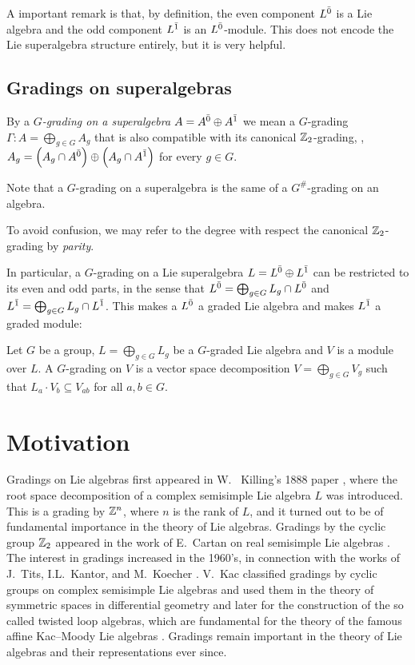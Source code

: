 A important remark is that, by definition, the even component $L^{\bar0}$ is a Lie algebra and the odd component $L^{\bar1}$ is an $L^{\bar0}$-module. This does not encode the Lie superalgebra structure entirely, but it is very helpful.

\subsection{Gradings on superalgebras}

By a \emph{$G$-grading on a superalgebra $A = A^{\bar0}\oplus A^{\bar1}$} we mean a $G$-grading $\Gamma : A= \bigoplus_{g \in G} A_g$ that is also compatible with its canonical $\mathbb{Z}_{2}$-grading, \ie, $A_g=\left(A_g\cap A^{\bar0}\right)\oplus\left(A_g\cap A^{\bar1}\right)$ for every $g\in G$.

\begin{remark}\label{rmk:G-sharp}
    Note that a $G$-grading on a superalgebra is the same of a $G^\#$-grading on an algebra.
\end{remark}

To avoid confusion, we may refer to the degree with respect the canonical $\mathbb{Z}_2$-grading by \emph{parity}. 

In particular, a $G$-grading on a Lie superalgebra $L=L^{\bar0}\oplus L^{\bar1}$ can be restricted to its even and odd parts, in the sense that $L^{\bar0} = \bigoplus_{g\in G} L_g\cap L^{\bar0}$ and $L^{\bar1} = \bigoplus_{g\in G} L_g\cap L^{\bar1}$. This makes a $L^{\bar0}$ a graded Lie algebra and makes $L^{\bar1}$ a graded module:

\begin{defi}
	Let $G$ be a group, $L = \bigoplus_{g\in G} L_g$ be a $G$-graded Lie algebra and $V$ is a module over $L$. A $G$-grading on $V$ is a vector space decomposition $V=\bigoplus_{g\in G} V_g$ such that $L_a\cdot V_b \subseteq V_{ab}$ for all $a,b\in G$.
\end{defi}

\section{Motivation}

Gradings on Lie algebras first appeared in W.~ Killing’s 1888 paper \cite{MR1510529}, where the root space decomposition of a complex semisimple Lie algebra $L$ was introduced. This is a grading by $\mathbb{Z}^n$, where $n$ is the rank of $L$, and it turned out to be of fundamental importance in the theory of Lie algebras. Gradings by the cyclic group $\mathbb{Z}_2$ appeared in the work of E.~Cartan on real semisimple Lie algebras \cite{Cartan-1914}. The interest in gradings increased in the 1960's, in connection with the works of J.~Tits, I.L.~Kantor, and M.~Koecher \cite{Tit62,Kan64,Koe67}. V.~Kac classified gradings by cyclic groups on complex semisimple Lie algebras and used them in the theory of symmetric spaces in differential geometry \cite{Kac68} and later for the construction of the so called twisted loop algebras, which are fundamental for the theory of the famous affine Kac--Moody Lie algebras \cite{Kac90}. Gradings remain important in the theory of Lie algebras and their representations ever since.

